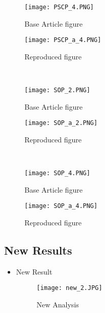 \documentclass{article}
\begin{document}
\begin{itemize}
\begin{figure}[htp]
    \centering
    \begin{minipage}{0.45\textwidth}
        \centering
        \texttt{[image: PSCP\_4.PNG]} %
        \caption{Base Article figure}
    \end{minipage}\hfill
    \begin{minipage}{0.45\textwidth}
        \centering
        \texttt{[image: PSCP\_a\_4.PNG]} %
        \caption{Reproduced figure}
    \end{minipage}
\end{figure}
\end{itemize}\\



\begin{itemize}
\begin{figure}[htp]
    \centering
    \begin{minipage}{0.45\textwidth}
        \centering
        \texttt{[image: SOP\_2.PNG]} %
        \caption{Base Article figure}
    \end{minipage}\hfill
    \begin{minipage}{0.45\textwidth}
        \centering
        \texttt{[image: SOP\_a\_2.PNG]} %
        \caption{Reproduced figure}
    \end{minipage}
\end{figure}
\end{itemize}\\


\begin{itemize}
\begin{figure}[htp]
    \centering
    \begin{minipage}{0.45\textwidth}
        \centering
        \texttt{[image: SOP\_4.PNG]} %
        \caption{Base Article figure}
    \end{minipage}\hfill
    \begin{minipage}{0.45\textwidth}
        \centering
        \texttt{[image: SOP\_a\_4.PNG]} %
        \caption{Reproduced figure}
    \end{minipage}
\end{figure}
\end{itemize}
\newpage
\subsection{New Results}
\begin{itemize}
\item New Result\\
\begin{figure}[htp]
        \centering
        \texttt{[image: new\_2.JPG]}
        \caption{New Analysis}
        \label{fig:my_label}
    \end{figure}
\end{itemize}
\end{document}
